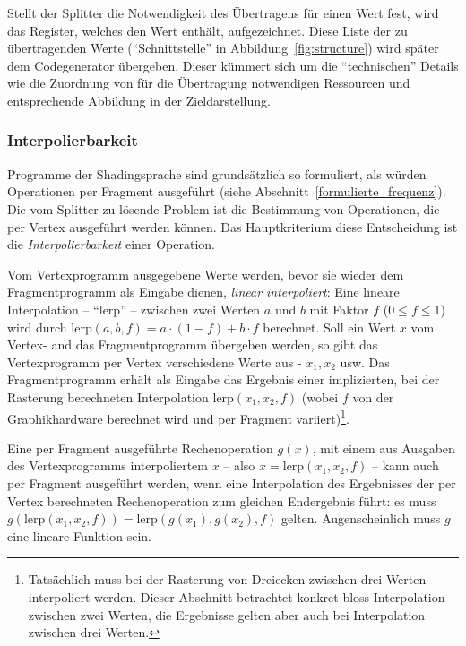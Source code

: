 \documentclass[twoside,a4paper,fleqn,12pt]{article}
\begin{document}
Stellt der Splitter die Notwendigkeit des Übertragens für einen Wert fest, wird das Register, welches den Wert enthält, aufgezeichnet.
Diese Liste der zu übertragenden Werte ("`Schnittstelle"' in Abbildung~\ref{fig:structure}) wird später dem Codegenerator übergeben.
Dieser kümmert sich um die "`technischen"' Details wie die Zuordnung von für die Übertragung notwendigen Ressourcen und %
entsprechende Abbildung in der Zieldarstellung.

\subsubsection{Interpolierbarkeit}
\label{Interpolierbarkeit}

Programme der Shadingsprache sind grundsätzlich so formuliert, als würden Operationen per Fragment ausgeführt (siehe Abschnitt~\ref{formulierte_frequenz}).
Die vom Splitter zu lösende Problem ist die Bestimmung von Operationen, die per Vertex ausgeführt werden können.
Das Hauptkriterium diese Entscheidung ist die \emph{Interpolierbarkeit} einer Operation.

\newcommand\lerp{\mathrm{lerp}}
Vom Vertexprogramm ausgegebene Werte werden, bevor sie wieder dem Fragmentprogramm als Eingabe dienen, \emph{linear interpoliert}: %
Eine lineare Interpolation -- "`$\lerp$"' -- zwischen zwei Werten $a$ und $b$ mit Faktor $f$ ($0 \le f \le 1$) wird durch $\lerp(a, b, f) = a \cdot (1-f) + b \cdot f$ berechnet.
Soll ein Wert $x$ vom Vertex- and das Fragmentprogramm übergeben werden, so gibt das Vertexprogramm per Vertex verschiedene Werte aus - $x_1, x_2$ usw.
Das Fragmentprogramm erhält als Eingabe das Ergebnis einer implizierten, bei der Rasterung berechneten Interpolation $\lerp(x_1, x_2, f)$ (wobei $f$ von der Graphikhardware berechnet wird
und per Fragment variiert)\footnote{Tatsächlich muss bei der Rasterung von Dreiecken zwischen drei Werten interpoliert werden. Dieser Abschnitt betrachtet konkret
bloss Interpolation zwischen zwei Werten, die Ergebnisse gelten aber auch bei Interpolation zwischen drei Werten.}.

Eine per Fragment ausgeführte Rechenoperation $g(x)$, mit einem aus Ausgaben des Vertexprogramms interpoliertem $x$ -- also $x = \lerp(x_1, x_2, f)$ --
kann auch per Fragment ausgeführt werden, wenn eine Interpolation des Ergebnisses der per Vertex berechneten Rechenoperation zum gleichen Endergebnis führt:
es muss $g(\lerp(x_1, x_2, f)) = \lerp (g(x_1), g(x_2), f)$ gelten. Augenscheinlich muss $g$ eine lineare Funktion sein.
\end{document}

